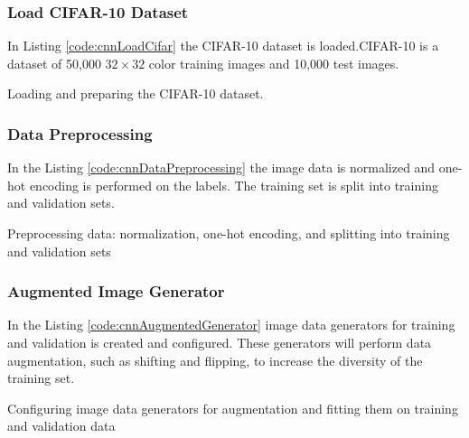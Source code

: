 \subsubsection{Load CIFAR-10 Dataset}

In Listing \ref{code:cnnLoadCifar} the CIFAR-10 dataset is loaded.CIFAR-10 is a dataset of 50,000 $32 \times 32$ color training images and 10,000 test images.

\begin{code}[h!]
	    
	
	\caption{Loading and preparing the CIFAR-10 dataset.}
	\label{code:cnnLoadCifar}
\end{code}

\subsubsection{Data Preprocessing}

In the Listing \ref{code:cnnDataPreprocessing} the image data is normalized and one-hot encoding is performed on the labels. The training set is split into training and validation sets.

\begin{code}[h!]
	    
	
	\caption{Preprocessing data: normalization, one-hot encoding, and splitting into training and validation sets}
	\label{code:cnnDataPreprocessing}
\end{code}

\subsubsection{Augmented Image Generator}

In the Listing \ref{code:cnnAugmentedGenerator} image data generators for training and validation is created and configured. These generators will perform data augmentation, such as shifting and flipping, to increase the diversity of the training set.

\begin{code}[h!]
	    
	
	\caption{Configuring image data generators for augmentation and fitting them on training and validation data}
	\label{code:cnnAugmentedGenerator}
\end{code}

